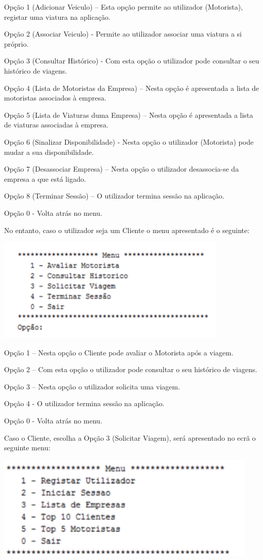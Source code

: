 \documentclass[12pt,a4paper]{report}
\begin{document}
Opção 1 (Adicionar Veiculo) – Esta opção permite ao utilizador (Motorista), registar uma viatura na aplicação.

Opção 2 (Associar Veiculo) - Permite ao utilizador associar uma viatura a si próprio.

Opção 3 (Consultar Histórico) - Com esta opção o utilizador pode consultar o seu histórico de   viagens.

Opção 4 (Lista de Motoristas da Empresa) – Nesta opção é apresentada a lista de motoristas associados à empresa.

Opção 5 (Lista de Viaturas duma Empresa) – Nesta opção é apresentada a lista de viaturas associadas à empresa.

Opção 6 (Sinalizar Disponibilidade) - Nesta opção o utilizador (Motorista) pode mudar a sua disponibilidade.

Opção 7 (Desassociar Empresa) – Nesta opção o utilizador desassocia-se da empresa a que está ligado.

Opção 8 (Terminar Sessão) – O utilizador termina sessão na aplicação.

Opção 0  - Volta atrás no menu.  

No entanto, caso o utilizador seja um Cliente o menu apresentado é o seguinte: 

\includegraphics[width=0.7\linewidth, height=5cm]{5.png}


Opção 1 – Nesta opção o Cliente pode avaliar o Motorista após a viagem. 

Opção 2 – Com esta opção o utilizador pode consultar o seu histórico de viagens.

Opção 3 – Nesta opção o utilizador solicita uma viagem.

Opção 4 - O utilizador termina sessão na aplicação.

Opção 0  - Volta atrás no menu.  

Caso o Cliente, escolha a Opção 3 (Solicitar Viagem), será apresentado no ecrã o seguinte menu:

\includegraphics[width=0.7\linewidth, height=5cm]{1.png}
\end{document}
